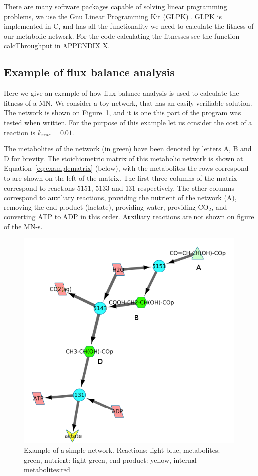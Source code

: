 \documentclass[a4paper,12pt]{article}
\begin{document}
	There are many software packages capable of solving linear programming problems, we use the Gnu Linear Programming Kit (GLPK) \cite{glpk}. GLPK is implemented in C, and has all the functionality we need to calculate the fitness of our metabolic network. For the code calculating the fitnesses see the function calcThroughput in APPENDIX X.


\subsection{Example of flux balance analysis}
\label{sub:example_of_flux_balance_analysis}

Here we give an example of how flux balance analysis is used to calculate the fitness of a MN. We consider a toy network, that has an easily verifiable solution. The network is shown on Figure~\ref{fig:examplenetwork}, and it is one this part of the program was tested when written. For the purpose of this example let us consider the cost of a reaction is $k_{reac}=0.01$.


	The metabolites of the network (in green) have been denoted by letters A, B and D for brevity. The stoichiometric matrix of this metabolic network is shown at Equation~\ref{eq:examplematrix} (below), with the metabolites the rows correspond to are shown on the left of the matrix. The first three columns of the matrix correspond to reactions $5151$, $5133$ and $131$ respectively. The other columns correspond to auxiliary reactions, providing the nutrient of the network (A), removing the end-product (lactate), providing water, providing CO$_2$, and converting ATP to ADP in this order. Auxiliary reactions are not shown on figure of the MN-s. 

\begin{figure}[htbp]
	\centering
	\includegraphics[width=0.5\linewidth]{initial_network_ABC.png}
	\caption{Example of a simple network. Reactions: light blue, metabolites: green, nutrient: light green, end-product: yellow, internal metabolites:red}
	\label{fig:examplenetwork}
\end{figure}
\end{document}
